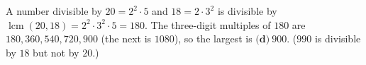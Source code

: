 A number divisible by $20=2^2\cdot5$ and $18=2\cdot3^2$ is divisible by $\operatorname{lcm}(20,18)=2^2\cdot3^2\cdot5=180$. The three-digit multiples of $180$ are $180,360,540,720,900$ (the next is $1080$), so the largest is $\boxed{\textbf{(d)}\ 900}$. ($990$ is divisible by $18$ but not by $20$.)
